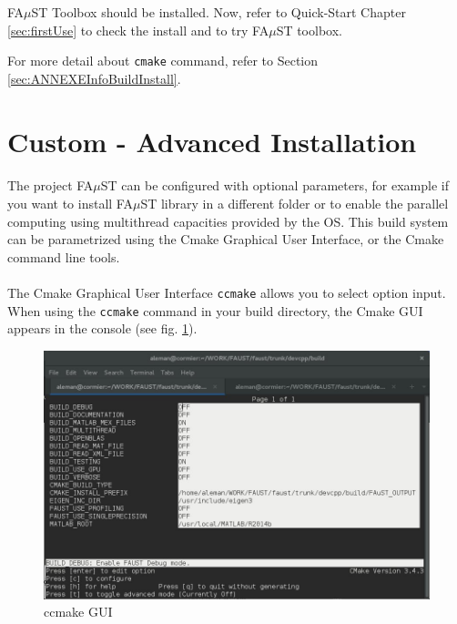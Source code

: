 FA$\mu$ST Toolbox should be installed. Now, refer to Quick-Start Chapter \ref{sec:firstUse} to check the install and to try FA$\mu$ST toolbox.

For more detail about \texttt{cmake} command, refer to Section \ref{sec:ANNEXEInfoBuildInstall}.



\section{Custom - Advanced Installation}\label{sec:UnixCustomInstall}

\paragraph{}The project FA$\mu$ST can be configured with optional parameters, for example if you want to install FA$\mu$ST library in a different folder or to enable the parallel computing using multithread capacities provided by the OS. This build system can be parametrized using the Cmake Graphical User Interface, or the Cmake command line tools. 

\paragraph{}The Cmake Graphical User Interface \texttt{ccmake} allows you to select option input. When using the \texttt{ccmake} command in your build directory, the Cmake GUI appears in the console (see fig. \ref{fig:ccmake}).

\begin{figure}[!h] %
\centering
\includegraphics[scale=0.5]{images/ccmake.jpg}
\caption{ccmake GUI}
\label{fig:ccmake}
\end{figure}

